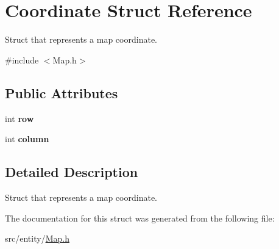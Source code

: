 \hypertarget{structCoordinate}{}\section{Coordinate Struct Reference}
\label{structCoordinate}


Struct that represents a map coordinate.  




{\ttfamily \#include $<$Map.\+h$>$}

\subsection*{Public Attributes}
\begin{DoxyCompactItemize}
\item 
\hypertarget{structCoordinate_a1731a846d76fa684b51477af2493a036}{}\label{structCoordinate_a1731a846d76fa684b51477af2493a036} 
int {\bfseries row}
\item 
\hypertarget{structCoordinate_aa98c59ced1ec817ab3fc64f8ce36e19a}{}\label{structCoordinate_aa98c59ced1ec817ab3fc64f8ce36e19a} 
int {\bfseries column}
\end{DoxyCompactItemize}


\subsection{Detailed Description}
Struct that represents a map coordinate. 

The documentation for this struct was generated from the following file\+:\begin{DoxyCompactItemize}
\item 
src/entity/\hyperlink{Map_8h}{Map.\+h}\end{DoxyCompactItemize}
